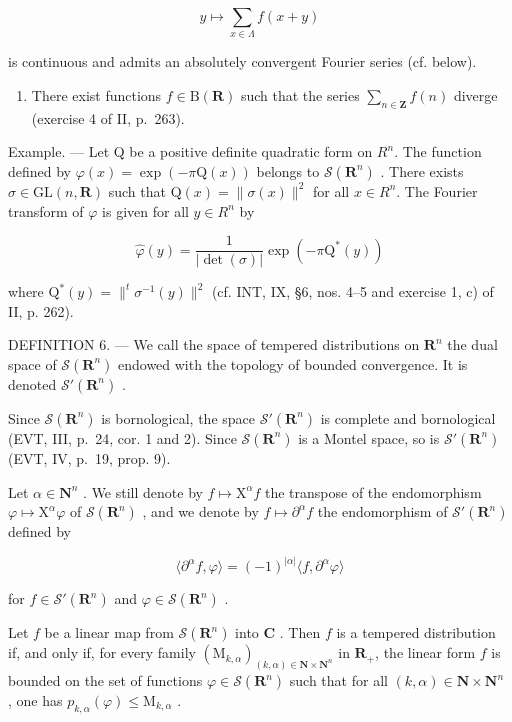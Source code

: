 \[
y \mapsto \sum_ {x \in \Lambda} f (x + y)
\]

is continuous and admits an absolutely convergent Fourier series (cf. below).

\begin{enumerate}
\def\labelenumi{\arabic{enumi})}
\setcounter{enumi}{1}
\tightlist
\item
  There exist functions \(f \in \mathrm{B}(\mathbf{R})\) such that the series \(\sum_{n \in \mathbf{Z}} f(n)\) diverge (exercise 4 of II, p.~263).
\end{enumerate}

Example. --- Let Q be a positive definite quadratic form on \(R^{n}\). The function defined by \(\varphi(x)=\exp(-\pi\mathrm{Q}(x))\) belongs to \(\mathcal{S}(\mathbf{R}^{n})\) . There exists \(\sigma\in\mathrm{GL}(n,\mathbf{R})\) such that \(\mathrm{Q}(x)=\|\sigma(x)\|^{2}\) for all \(x\in R^{n}\). The Fourier transform of \(\varphi\) is given for all \(y\in R^{n}\) by

\[
\widehat {\varphi} (y) = \frac {1}{| \det (\sigma) |} \exp (- \pi \mathrm{Q} ^ {*} (y))
\]

where \(\mathrm{Q}^{*}(y)=\|^{t}\sigma^{-1}(y)\|^{2}\) (cf. INT, IX, §6, nos. 4–5 and exercise 1, c) of II, p. 262).

DEFINITION 6. --- We call the space of tempered distributions on \(\mathbf{R}^{n}\) the dual space of \(\mathcal{S}(\mathbf{R}^{n})\) endowed with the topology of bounded convergence. It is denoted \(\mathcal{S}'(\mathbf{R}^{n})\) .

Since \(\mathcal{S}(\mathbf{R}^n)\) is bornological, the space \(\mathcal{S}'(\mathbf{R}^n)\) is complete and bornological (EVT, III, p.~24, cor. 1 and 2). Since \(\mathcal{S}(\mathbf{R}^n)\) is a Montel space, so is \(\mathcal{S}'(\mathbf{R}^n)\) (EVT, IV, p.~19, prop. 9).

Let \(\alpha\in\mathbf{N}^{n}\) . We still denote by \(f\mapsto\mathrm{X}^{\alpha}f\) the transpose of the endomorphism \(\varphi\mapsto\mathrm{X}^{\alpha}\varphi\) of \(\mathcal{S}(\mathbf{R}^{n})\) , and we denote by \(f\mapsto\partial^{\alpha}f\) the endomorphism of \(\mathcal{S}'(\mathbf{R}^{n})\) defined by

\[
\langle \partial^ {\alpha} f, \varphi \rangle = (- 1) ^ {| \alpha |} \langle f, \partial^ {\alpha} \varphi \rangle
\]

for \(f\in \mathcal{S}'(\mathbf{R}^n)\) and \(\varphi \in \mathcal{S}(\mathbf{R}^n)\) .

Let \(f\) be a linear map from \(\mathcal{S}(\mathbf{R}^{n})\) into \(\mathbf{C}\) . Then \(f\) is a tempered distribution if, and only if, for every family \((\mathrm{M}_{k,\alpha})_{(k,\alpha)\in\mathbf{N}\times\mathbf{N}^{n}}\) in \(\mathbf{R}_{+}\), the linear form \(f\) is bounded on the set of functions \(\varphi\in\mathcal{S}(\mathbf{R}^{n})\) such that for all \((k,\alpha)\in\mathbf{N}\times\mathbf{N}^{n}\) , one has \(p_{k,\alpha}(\varphi)\leqslant\mathrm{M}_{k,\alpha}\) .

